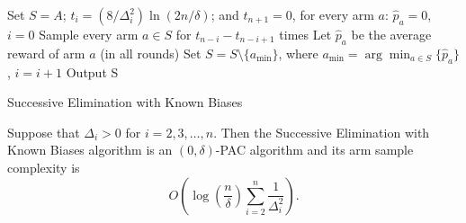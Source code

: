 \medbreak
\begin{algorithm}[H]
 
Set $S = A$; $t_i =  (8/\Delta_i^2) \ln (2n/\delta)
    $; and $t_{n+1}=0$, for every arm $a$: $\hat{p}_a = 0$,
    $i=0$\;
    {
    Sample every arm $a \in S$ for $t_{n-i} - t_{n-i+1}$ times\;
    Let $\hat{p}_a$ be the average reward of arm $a$ (in all
    rounds)\;
    Set $S = S \setminus \{a_{\min}\}$, where
    $a_{\min}=\arg\min _{a\in S} \{ \hat{p}_a\}$,
    $i = i + 1$\;
    }
    Output S\;
\caption{Successive Elimination with Known Biases \label{alg:sucknown}}
\end{algorithm}
\begin{theorem} \label{th:sucelimknown}
Suppose that $\Delta_i>0$ for $i=2,3,\ldots,n$. Then the Successive
Elimination with Known Biases algorithm is an $(0,\delta)$-PAC
algorithm and its arm sample complexity is
\begin{equation} \label{eq:sucelim}
O\left(\log\left(\frac{n}{\delta}\right)\sum_{i=2}^{n}\frac{1}{\Delta_i^2}\right).
\end{equation}
\end{theorem}
